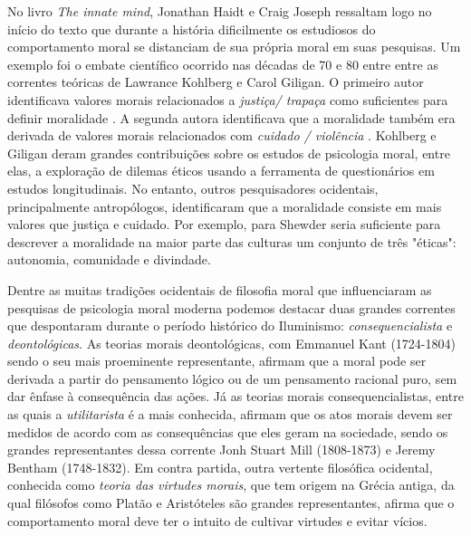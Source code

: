 No livro \textit{The innate mind}\cite{Haidt2007a}, Jonathan Haidt e Craig
Joseph ressaltam logo no início do texto que durante a história dificilmente
os estudiosos do comportamento moral se distanciam de sua própria moral em
suas pesquisas. Um exemplo foi o embate científico ocorrido nas décadas de 70
e 80 entre entre as correntes teóricas de Lawrance Kohlberg e Carol Giligan.
O primeiro autor identificava  valores morais relacionados a \textit{justiça/
trapaça} como suficientes para definir moralidade \citep{Kohlberg1969}. A
segunda autora identificava que a moralidade também era derivada de valores
morais relacionados com \textit{cuidado / violência} \citep{Gilligan1982}.
Kohlberg e Giligan deram grandes contribuições sobre os estudos de psicologia
moral, entre elas, a exploração de dilemas éticos usando a ferramenta de
questionários em estudos longitudinais. No entanto, outros pesquisadores
ocidentais, principalmente antropólogos, identificaram que a moralidade
consiste em mais valores que justiça e cuidado. Por exemplo, para Shewder
\citep{Shweder1997a} seria suficiente para descrever a moralidade na maior
parte das culturas um conjunto de três "éticas": autonomia, comunidade
e divindade.

Dentre as muitas tradições ocidentais de filosofia moral
que influenciaram as pesquisas de psicologia moral moderna
podemos destacar duas grandes correntes que despontaram durante
o período histórico do Iluminismo: \textit{consequencialista} e
\textit{deontológicas}.
As teorias morais deontológicas, com Emmanuel Kant (1724-1804) sendo o seu
mais proeminente representante, afirmam que a moral pode ser derivada a partir
do pensamento lógico ou de um pensamento racional puro, sem dar ênfase à  
consequência das ações. Já as teorias morais consequencialistas, entre
as quais a \textit{utilitarista} é a mais conhecida, afirmam que os atos
morais devem ser medidos de acordo com as consequências que eles geram
na sociedade, sendo os grandes representantes dessa corrente Jonh Stuart
Mill (1808-1873) e Jeremy Bentham (1748-1832).  Em contra partida, outra
vertente filosófica ocidental, conhecida como \textit{teoria das virtudes
morais}, que tem origem na Grécia antiga, da qual filósofos como Platão e
Aristóteles são grandes representantes, afirma que o comportamento moral
deve ter o intuito de cultivar virtudes e evitar vícios.

